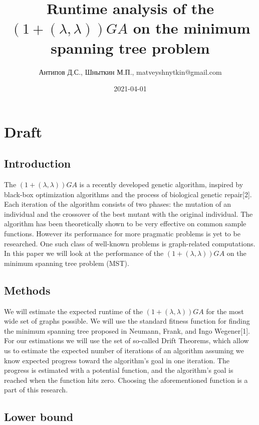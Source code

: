 \documentclass{article}
\title{Runtime analysis of the $(1 + (\lambda, \lambda)) GA$ on the minimum spanning tree problem}
\date{2021-04-01}
\author{Антипов Д.С., Шныткин М.П., matveyshnytkin@gmail.com}
\begin{document}
  \maketitle
  \newpage
  

  \section{Draft}
  

  \subsection{Introduction}

The $(1 + (\lambda, \lambda)) GA$ is a recently developed genetic algorithm, inspired by black-box optimization algorithms and the process of biological genetic repair[2]. Each iteration of the algorithm consists of two phases: the mutation of an individual and the crossover of the best mutant with the original individual. The algorithm has been theoretically shown to be very effective on common sample functions. However its performance for more pragmatic problems is yet to be researched. One such class of well-known problems is graph-related computations. In this paper we will look at the performance of the  $(1 + (\lambda, \lambda)) GA$ on the minimum spanning tree problem (MST).


  \subsection{Methods}

We will estimate the expected runtime of the  $(1 + (\lambda, \lambda)) GA$ for the most wide set of graphs possible. We will use the standard fitness function for finding the minimum spanning tree proposed in Neumann, Frank, and Ingo Wegener[1]. For our estimations we will use the set of so-called Drift Theorems, which allow us to estimate the expected number of iterations of an algorithm assuming we know expected progress toward the algorithm's goal in one iteration. The progress is estimated with a potential function, and the algorithm’s goal is reached when the function hits zero. Choosing the aforementioned function is a part of this research. 
  
  \subsection{Lower bound}
\end{document}
